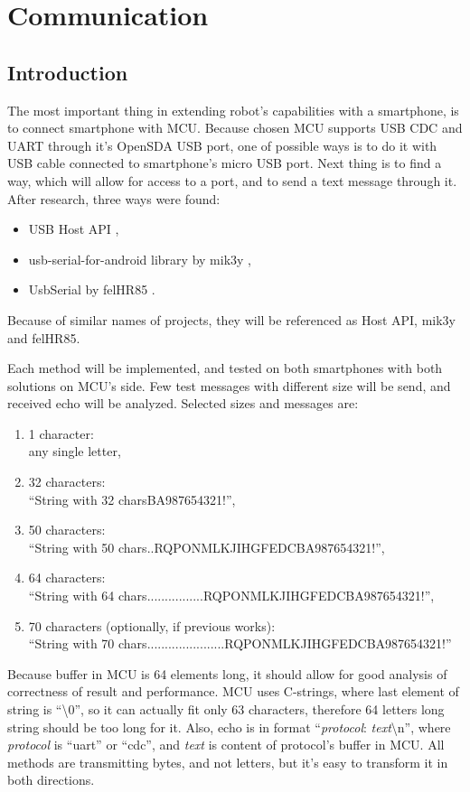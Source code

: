 \chapter{Communication}

\section{Introduction}
The most important thing in extending robot's capabilities with a smartphone, is
to connect smartphone with MCU.
Because chosen MCU supports USB CDC and UART through it's OpenSDA USB port, one
of possible ways is to do it with USB cable connected to smartphone's micro USB port.
Next thing is to find a way, which will allow for access to a port, and to send
a text message through it.
After research, three ways were found:
\begin{itemize}
  \item USB Host API \cite{android_reference},
  \item usb-serial-for-android library by mik3y \cite{mik3y},
  \item UsbSerial by felHR85 \cite{felHR85}.
\end{itemize}
Because of similar names of projects, they will be referenced as Host API,
mik3y and felHR85.

Each method will be implemented, and tested on both smartphones with both
solutions on MCU's side.
Few test messages with different size will be send, and received echo will be
analyzed.
Selected sizes and messages are:
\begin{enumerate}
  \item 1 character:\\
  	any single letter,
  \item 32 characters:\\
  	``String with 32 charsBA987654321!'',
  \item 50 characters:\\
  	``String with 50 chars..RQPONMLKJIHGFEDCBA987654321!'',
  \item 64 characters:\\
  	``String with 64 chars................RQPONMLKJIHGFEDCBA987654321!'',
  \item 70 characters (optionally, if previous works):\\
  	``String with 70 chars......................RQPONMLKJIHGFEDCBA987654321!''
\end{enumerate}
Because buffer in MCU is 64 elements long, it should allow for good analysis of
correctness of result and performance.
MCU uses C-strings, where last element of string is ``\textbackslash 0'', so it
can actually fit only 63 characters, therefore 64 letters long string should be
too long for it.
Also, echo is in format ``\emph{protocol}: \emph{text}\textbackslash n'', where
\emph{protocol} is ``uart'' or ``cdc'', and \emph{text} is content of protocol's
buffer in MCU.
All methods are transmitting bytes, and not letters, but it's easy to transform
it in both directions.

